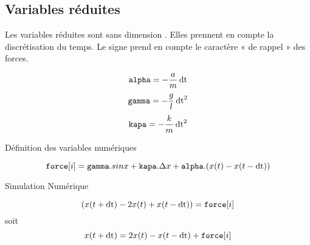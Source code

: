 \subsection{Variables réduites}

Les variables réduites sont sans dimension . Elles prennent en compte la discrétisation du temps. Le signe prend en compte le caractère « de rappel » des forces.

\[
\texttt{alpha} =  - \frac{a}{m}\operatorname{dt}
\]
\[
\texttt{gamma} =  - \frac{g}{l}\operatorname{dt}^2
\]
\[
\texttt{kapa} =  - \frac{k}{m}\operatorname{dt}^2
\]

Définition des variables numériques

\[
	\texttt{force}[i] = \texttt{gamma}.sinx + \texttt{kapa}. \Delta x + \texttt{alpha}.(x(t)-x(t-\operatorname{dt}))
\]

Simulation Numérique

\[
	( x(t+\operatorname{dt}) - 2x(t) + x(t-\operatorname{dt}) ) = \texttt{force}[i]
\]
soit
\[
	x(t+\operatorname{dt}) = 2 x(t) - x(t-\operatorname{dt}) + \texttt{force}[i]
\]



